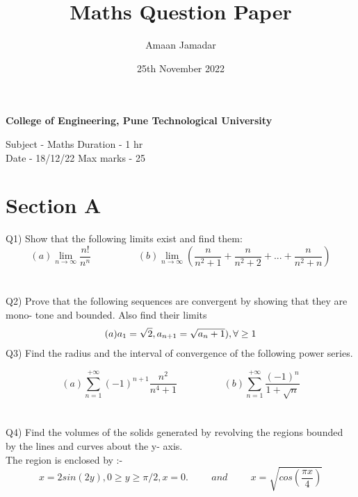 \documentclass[25pt]{article}
\title{Maths Question Paper}
\author{Amaan Jamadar}
\date{25th November 2022}
\begin{document}
\begin{large}
\maketitle
\clearpage
\begin{center}
\textbf{College of Engineering, Pune Technological University}
\end{center}
Subject - Maths\hspace{5cm} Duration - 1 hr\\
Date - 18/12/22\hspace{5cm} Max marks - 25
\section*{Section A}
\noindent Q1) Show that the following limits exist and find them:
\begin{equation*}
(a)\lim_{n\to\infty} \frac{n!}{n^n}\hspace{2cm}
(b) \lim_{n\to\infty} (\frac{n}{n^2 + 1} + \frac{n}{n^2 + 2} + ... + \frac{n}{n^2 + n})
\end{equation*}
\\\\
\noindent Q2) Prove that the following sequences are convergent by showing that they are mono-
tone and bounded. Also find their limits\\
\begin{align*}
\vspace{1mm}
&(a)a_1 = \sqrt{2},a_{n+1} = \sqrt{a_n + 1}), \forall\ge 1\\
\end{align*}
Q3) Find the radius and the interval of convergence of the following power series.

\begin{equation*}
(a) \sum_{n = 1}^{+\infty} (-1)^{n + 1} \frac{n^2}{n^4 + 1} \hspace{2cm} (b) \sum_{n = 1}^{+\infty} \frac{(-1)^n}{1 + \sqrt{n}}
\end{equation*}
\\\\
\noindent Q4) Find the volumes of the solids generated by revolving the regions bounded by the
lines and curves about the y- axis.\\
The region is enclosed by :-
\begin{equation*}
 x = 2sin(2y), 0 \geq y \geq \pi /2, x = 0. \hspace{1cm}and \hspace{1cm} x = \sqrt{cos(\frac{\pi x}{4})}
\end{equation*}

\end{large}
\end{document}
